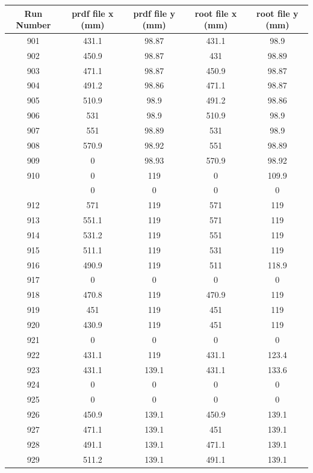 \documentclass[hidelinks,11pt]{article}
\numberwithin{figure}{section}
\numberwithin{table}{section}
\begin{document}
\begin{table}[h]
\centering
\begin{tabular}{|c|c|c|c|c|}
\hline
Run Number & prdf file x (mm)   &  prdf file y (mm) & root file x (mm)   &  root file y (mm)    \\
\hline
901  & 431.1  &  98.87 &    	431.1  &  98.9 \\
902  & 450.9  &  98.87 &	431  &  98.89 \\ 
903  & 471.1  &  98.87 &	450.9  &  98.87 \\ 
904  & 491.2  &  98.86 &			471.1  &  98.87 \\ 
905  & 510.9  &  98.9 &	491.2  &  98.86 \\ 
906  & 531  &  98.9 &	510.9  &  98.9 \\ 
907  & 551  &  98.89 &	531  &  98.9 \\ 
908  & 570.9  &  98.92 &	551  &  98.89 \\ 
909  & 0  &  98.93 &			570.9  &  98.92 \\ 
910  & 0  &  119 &			0  &  109.9 \\ 
\iffalse
911  & 0  &  0 &			0  &  0 \\ 
912  & 571  &  119 &			571  &  119 \\ 
913  & 551.1  &  119 &			571  &  119 \\ 
914  & 531.2  &  119 &			551  &  119 \\ 
915  & 511.1  &  119 &			531  &  119 \\ 
916  & 490.9  &  119 &			511  &  118.9 \\ 
917  & 0  &  0 &			0  &  0 \\ 
918  & 470.8  &  119 &			470.9  &  119 \\ 
919  & 451  &  119 &			451  &  119 \\ 
920  & 430.9  &  119 &			451  &  119 \\ 
921  & 0  &  0 &			0  &  0 \\ 
922  & 431.1  &  119 &			431.1  &  123.4 \\ 
923  & 431.1  &  139.1 &			431.1  &  133.6 \\ 
924  & 0  &  0 &			0  &  0 \\ 
925  & 0  &  0 &			0  &  0 \\ 
926  & 450.9  &  139.1 &			450.9  &  139.1 \\ 
927  & 471.1  &  139.1 &			451  &  139.1 \\ 
928  & 491.1  &  139.1 &			471.1  &  139.1 \\ 
929  & 511.2  &  139.1 &			491.1  &  139.1 \\ 

\end{tabular}
\end{table}
\end{document}
